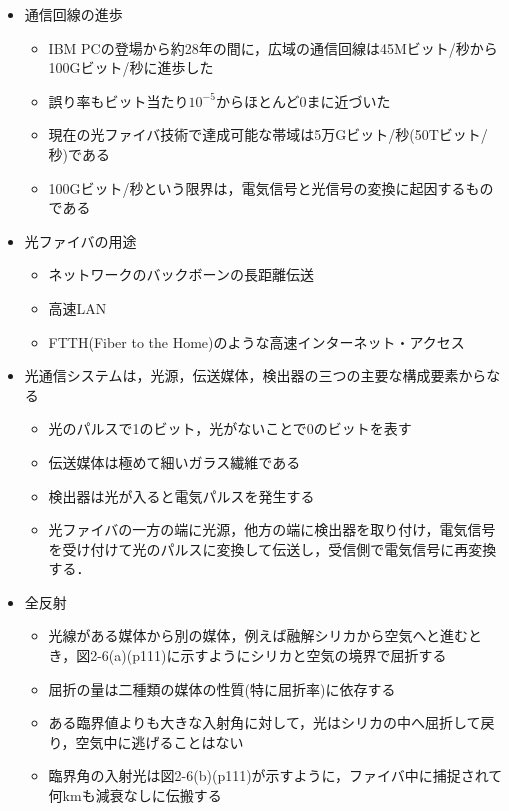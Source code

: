 \documentclass[a4paper]{ltjsarticle}
\begin{document}
			\begin{itemize}
				\item 通信回線の進歩
				\begin{itemize}
					\item IBM PCの登場から約28年の間に，広域の通信回線は45Mビット/秒から100Gビット/秒に進歩した
					\item 誤り率もビット当たり$10^{-5}$からほとんど0まに近づいた
					\item 現在の光ファイバ技術で達成可能な帯域は5万Gビット/秒(50Tビット/秒)である
					\item 100Gビット/秒という限界は，電気信号と光信号の変換に起因するものである
				\end{itemize}
				\item 光ファイバの用途
				\begin{itemize}
					\item ネットワークのバックボーンの長距離伝送
					\item 高速LAN
					\item FTTH(Fiber to the Home)のような高速インターネット・アクセス
				\end{itemize}
				\item 光通信システムは，光源，伝送媒体，検出器の三つの主要な構成要素からなる
				\begin{itemize}
					\item 光のパルスで1のビット，光がないことで0のビットを表す
					\item 伝送媒体は極めて細いガラス繊維である
					\item 検出器は光が入ると電気パルスを発生する
					\item 光ファイバの一方の端に光源，他方の端に検出器を取り付け，電気信号を受け付けて光のパルスに変換して伝送し，受信側で電気信号に再変換する．
				\end{itemize}
				\item 全反射
				\begin{itemize}
					\item 光線がある媒体から別の媒体，例えば融解シリカから空気へと進むとき，図2-6(a)(p111)に示すようにシリカと空気の境界で屈折する
					\item 屈折の量は二種類の媒体の性質(特に屈折率)に依存する
					\item ある臨界値よりも大きな入射角に対して，光はシリカの中へ屈折して戻り，空気中に逃げることはない
					\item 臨界角の入射光は図2-6(b)(p111)が示すように，ファイバ中に捕捉されて何kmも減衰なしに伝搬する
				\end{itemize}

\end{itemize}
\end{document}
